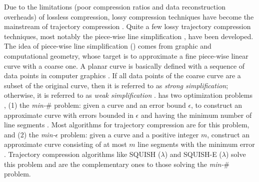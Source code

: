 Due to the  limitations (poor compression ratios and data reconstruction overheads) of lossless compression, lossy compression techniques have become the mainstream of trajectory compression \cite{Lin:Operb,Zhang:Evaluation}. Quite a few lossy trajectory compression techniques, most notably the piece-wise line simplification \cite{Keogh:online,Liu:BQS, Muckell:Compression, Chen:Trajectory, Chen:Fast, Cao:Spatio,Shi:Survey,Cao:Dots,Chen:Compression,Ghica:DTracking,Ke:Interval,Lange:Tracking,Lin:Cised,Lin:Operb,Liu:Amnesic,Long:Direction,Meratnia:Spatiotemporal,Muckell:SQUISH,Trajcevski:DDR},  have been developed.
%
The idea of piece-wise line simplification (\lsa) comes from graphic and computational geometry, whose target is to approximate a fine piece-wise linear curve with a coarse one. {A planar curve is basically defined with a sequence of data points in computer graphics \cite{Williams:Bounded}. If all data points of the coarse curve are a subset of the original curve, then it is referred to as \emph{strong simplification}; otherwise, it is referred to as  \emph{weak simplification} \cite{Trajcevski:DDR}. \lsa has two optimization problems \cite{Chan:Optimal, Imai:Optimal,Pavlidis:Segment}, (1) the \emph{min-$\#$} problem: given  a curve  and an error bound $\epsilon$, to construct an approximate curve with errors bounded in $\epsilon$ and having the minimum number of line segments \cite{Chan:Optimal, Imai:Optimal}. Most \lsa algorithms for trajectory compression \cite{Douglas:Peucker, Hershberger:Speeding, Keogh:online,Liu:BQS, Muckell:Compression, Chen:Trajectory, Chen:Fast, Cao:Spatio,Cao:Dots,Chen:Compression,Ghica:DTracking,Ke:Interval,Lange:Tracking,Lin:Cised,Lin:Operb,Liu:Amnesic,Long:Direction,Meratnia:Spatiotemporal,Trajcevski:DDR} are for this problem, and}
{(2) the \emph{min-$\epsilon$} problem: given  a curve  and a positive integer $m$, construct an approximate curve consisting of at most $m$ line segments with the minimum error \cite{Chan:Optimal, Imai:Optimal}. Trajectory compression algorithms like SQUISH ($\lambda$) \cite{Muckell:SQUISH} and SQUISH-E ($\lambda$) \cite{Muckell:Compression} solve this problem and are the complementary ones to those solving the \emph{min-$\#$} problem.}
